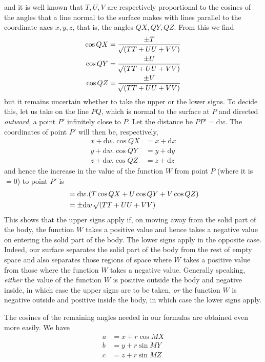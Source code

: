 and it is well known that $T,U,V$ are respectively proportional to the cosines of the angles that a line normal to the surface makes with lines parallel to the coordinate axes $x,y,z$, that is, the angles $QX,QY,QZ$. From this we find
\[
\begin{aligned}
\cos QX&=\frac{\pm T}{\mathord{{}^{}\!\surd}(TT+UU+VV)}\\
\cos QY&=\frac{\pm U}{\mathord{{}^{}\!\surd}(TT+UU+VV)}\\
\cos QZ&=\frac{\pm V}{\mathord{{}^{}\!\surd}(TT+UU+VV)}
\end{aligned}
\]
but it remains uncertain whether to take the upper or the lower signs. To decide this, let us take on the line $PQ$, which is normal to the surface at $P$ and directed \textit{outward}, a point $P'$ infinitely close to $P$. Let the distance be $PP'=\mathrm{d}w$. The coordinates of point $P'$ will then be, respectively,
\[
\begin{aligned}
x+\mathrm{d}w.\cos QX&=x+\mathrm{d}x\\
y+\mathrm{d}w.\cos QY&=y+\mathrm{d}y\\
z+\mathrm{d}w.\cos QZ&=z+\mathrm{d}z
\end{aligned}
\]
and hence the increase in the value of the function $W$ from point $P$ (where it is $=0$) to point $P'$ is
\[
\begin{aligned}
&=\mathrm{d}w.(T\cos QX+U\cos QY+V\cos QZ)\\
&=\pm\mathrm{d}w.\mathord{{}^{}\!\surd}(TT+UU+VV)
\end{aligned}
\]
This shows that the upper signs apply if, on moving away from the solid part of the body, the function $W$ takes a positive value and hence takes a negative value on entering the solid part of the body. The lower signs apply in the opposite case. Indeed, our surface separates the solid part of the body from the rest of empty space and also separates those regions of space where $W$ takes a positive value from those where the function $W$ takes a negative value. Generally speaking, \textit{either} the value of the function $W$ is positive outside the body and negative inside, in which case the upper signs are to be taken, \textit{or} the function $W$ is negative outside and positive inside the body, in which case the lower signs apply.

The cosines of the remaining angles needed in our formulas are obtained even more easily. We have
\[
\begin{aligned}
a&=x+r\cos MX\\
b&=y+r\sin MY\\
c&=z+r\sin MZ
\end{aligned}
\]

